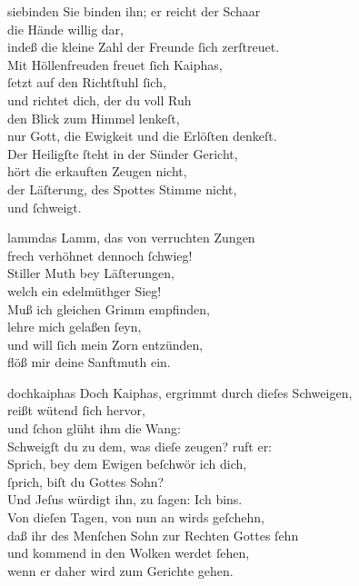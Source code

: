 \documentclass[shorttitlesize=55,tocstyle=ref-genre]{ees}
\begin{document}
{\begin{movement}{siebinden}
  \voice[Tenore]
  Sie binden ihn; er reicht der Schaar\\
  die Hände willig dar,\\
  indeß die kleine Zahl der Freunde ſich zerſtreuet.\\
  Mit Höllenfreuden freuet ſich Kaiphas,\\
  ſetzt auf den Richtſtuhl ſich,\\
  und richtet dich, der du voll Ruh\\
  den Blick zum Himmel lenkeſt,\\
  nur Gott, die Ewigkeit und die Erlöſten denkeſt.\\
  Der Heiligſte ſteht in der Sünder Gericht,\\
  hört die erkauften Zeugen nicht,\\
  der Läſterung, des Spottes Stimme nicht,\\
  und ſchweigt.
\end{movement}

\clearpage
\begin{movement}{lammdas}
  \voice[Coro]
  Lamm, das von verruchten Zungen\\
  frech verhöhnet dennoch ſchwieg!\\
  Stiller Muth bey Läſterungen,\\
  welch ein edelmüthger Sieg!\\
  Muß ich gleichen Grimm empfinden,\\
  lehre mich gelaßen ſeyn,\\
  und will ſich mein Zorn entzünden,\\
  flöß mir deine Sanftmuth ein.
\end{movement}

\begin{movement}{dochkaiphas}
  \voice[Soprano]
  Doch Kaiphas, ergrimmt durch dieſes Schweigen,\\
  reißt wütend ſich hervor,\\
  und ſchon glüht ihm die Wang:\\
  Schweigſt du zu dem, was dieſe zeugen? ruft er:\\
  Sprich, bey dem Ewigen beſchwör ich dich,\\
  ſprich, biſt du Gottes Sohn?\\
  Und Jeſus würdigt ihn, zu ſagen: Ich bins.\\
  Von dieſen Tagen, von nun an wirds geſchehn,\\
  daß ihr des Menſchen Sohn zur Rechten Gottes ſehn\\
  und kommend in den Wolken werdet ſehen,\\
  wenn er daher wird zum Gerichte gehen.
\end{movement}

}
\end{document}
